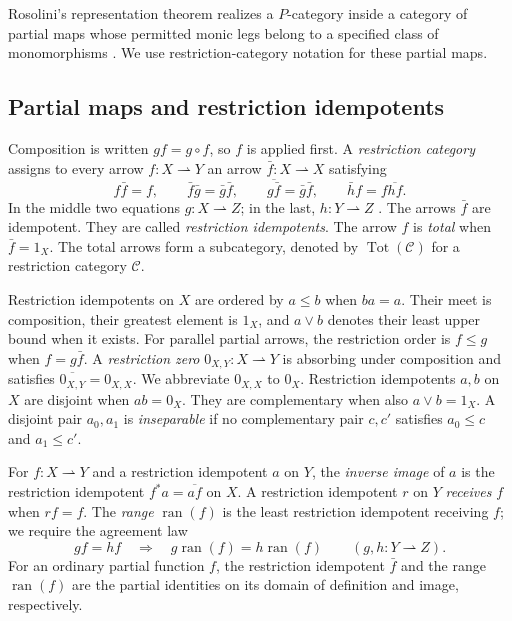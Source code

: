 \documentclass[11pt]{article}
\newcommand{\ran}{\operatorname{ran}}
\begin{document}
Rosolini's representation theorem realizes a $P$-category inside a
category of partial maps whose permitted monic legs belong to a
specified class of monomorphisms \cite[Theorem 1.2]{Rosolini}.
We use restriction-category notation for these partial maps.

\subsection{Partial maps and restriction idempotents}

Composition is written $gf=g\circ f$, so $f$ is applied first.
A \emph{restriction category} assigns to every arrow
$f:X\rightharpoonup Y$ an arrow
$\bar f:X\rightharpoonup X$ satisfying
\[
 f\bar f=f,\qquad
 \bar f\bar g=\bar g\bar f,\qquad
 \overline{g\bar f}=\bar g\bar f,\qquad
 \bar h f=f\overline{hf}.
\]
In the middle two equations $g:X\rightharpoonup Z$; in the last,
$h:Y\rightharpoonup Z$ \cite{CockettLack}.
The arrows $\bar f$ are idempotent. They are called
\emph{restriction idempotents}.
The arrow $f$ is \emph{total} when $\bar f=1_X$.
The total arrows form a subcategory, denoted by
$\operatorname{Tot}(\mathcal C)$ for a restriction category $\mathcal C$.

Restriction idempotents on $X$ are ordered by $a\le b$ when $ba=a$.
Their meet is composition, their greatest element is $1_X$, and
$a\vee b$ denotes their least upper bound when it exists.
For parallel partial arrows, the restriction order is
$f\le g$ when $f=g\bar f$.
A \emph{restriction zero} $0_{X,Y}:X\rightharpoonup Y$ is
absorbing under composition and satisfies
$\overline{0_{X,Y}}=0_{X,X}$. We abbreviate $0_{X,X}$ to $0_X$.
Restriction idempotents $a,b$ on $X$ are disjoint when $ab=0_X$.
They are complementary when also $a\vee b=1_X$.
A disjoint pair $a_0,a_1$ is \emph{inseparable} if no complementary
pair $c,c'$ satisfies $a_0\le c$ and $a_1\le c'$.

For $f:X\rightharpoonup Y$ and a restriction idempotent $a$ on $Y$,
the \emph{inverse image} of $a$ is the restriction idempotent
$f^*a=\overline{af}$ on $X$.
A restriction idempotent $r$ on $Y$ \emph{receives} $f$ when $rf=f$.
The \emph{range} $\ran(f)$ is the least restriction idempotent receiving $f$;
we require the agreement law
\[
 gf=hf\quad\Longrightarrow\quad
 g\ran(f)=h\ran(f)
 \qquad(g,h:Y\rightharpoonup Z).
\]
For an ordinary partial function $f$, the restriction idempotent
$\bar f$ and the range $\ran(f)$ are the partial identities on its
domain of definition and image, respectively.
\end{document}
